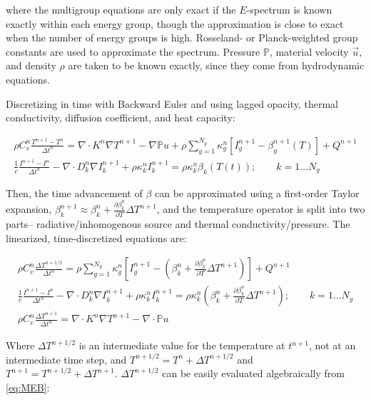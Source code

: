 \documentclass{template}
\begin{document}
where the multigroup equations are only exact if the $E$-spectrum is known exactly within each energy group, though the approximation is close to exact when the number of energy groups is high. Rosseland- or Planck-weighted group constants are used to approximate the spectrum. Pressure $\mathbb{P}$, material velocity $\vec{u}$, and density $\rho$ are taken to be known exactly, since they come from hydrodynamic equations.

Discretizing in time with Backward Euler and using lagged opacity, thermal conductivity, diffusion coefficient, and heat capacity:

\begin{gather}
  \rho C_v^n \frac{T^{n+1} - T^n}{\Delta t^n} = \nabla \cdot K^n \nabla T^{n+1} - \nabla {\mathbb{P}u} + \rho \sum_{g=1}^{N_g} \kappa_g^n \left[ I_g^{n+1} - \beta_g^{n+1}(T) \right] + Q^{n+1}\\
  \frac{1}{c}\frac{I^{n+1} - I^n}{\Delta t^n} - \nabla \cdot D_k^n \nabla I_k^{n+1} + \rho \kappa_k^n I_k^{n+1} = \rho \kappa_k^n \beta_k(T(t)); \qquad k=1\dots N_g
\end{gather}

Then, the time advancement of $\beta$ can be approximated using a first-order Taylor expansion, $\beta_k^{n+1} \approx \beta_k^n + \frac{\partial \beta_k^n}{\partial T}\Delta T^{n+1}$, and the temperature operator is split into two parts-- radiative/inhomogenous source and thermal conductivity/pressure. The linearized, time-discretized equations are:


  \begin{gather}
    \label{eq:MEB}\rho C_v^n \frac{\Delta T^{n+1/2}}{\Delta t^n} =  \rho \sum_{g=1}^{N_g} \kappa_g^n \left[ I_g^{n+1} - \left( \beta_k^n + \frac{\partial \beta_k^n}{\partial T}\Delta T^{n+1}\right) \right] + Q^{n+1}\\
    \label{eq:intermediate_intensity}\frac{1}{c}\frac{I^{n+1} - I^n}{\Delta t^n} - \nabla \cdot D_k^n \nabla I_k^{n+1} + \rho \kappa_k^n I_k^{n+1} = \rho \kappa_k^n \left( \beta_k^n + \frac{\partial \beta_k^n}{\partial T}\Delta T^{n+1}\right); \qquad k=1\dots N_g\\
    \rho C_v^n \frac{\Delta T^{n+1}}{\Delta t^n} = \nabla \cdot K^n \nabla T^{n+1} - \nabla \cdot {\mathbb{P}u}
  \end{gather}




Where $\Delta T^{n+1/2}$ is an intermediate value for the temperature at $t^{n+1}$, not at an intermediate time step, and $T^{n+1/2} = T^n + \Delta T^{n+1/2}$ and $T^{n+1} = T^{n+1/2} + \Delta T^{n+1}$. $\Delta T^{n+1/2}$ can be easily evaluated algebraically from \autoref{eq:MEB}:
\end{document}
